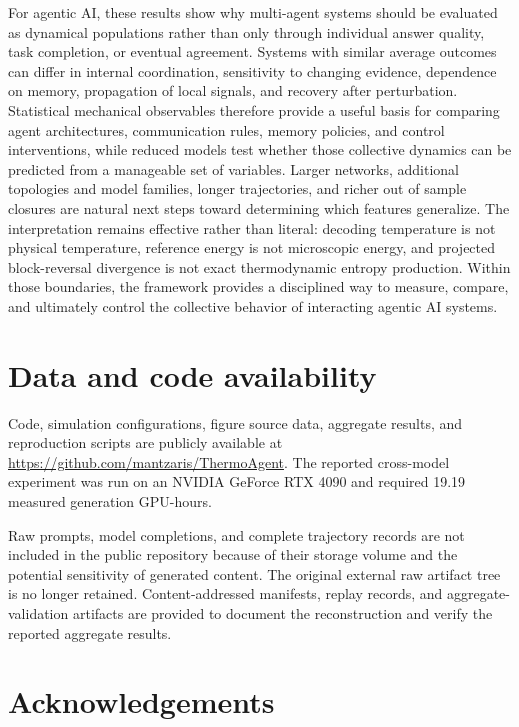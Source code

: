 \documentclass[12pt]{article}
\begin{document}
For agentic AI, these results show why multi-agent systems should be evaluated
as dynamical populations rather than only through individual answer quality,
task completion, or eventual agreement. Systems with similar average outcomes
can differ in internal coordination, sensitivity to changing evidence,
dependence on memory, propagation of local signals, and recovery after
perturbation. Statistical mechanical observables therefore provide a useful
basis for comparing agent architectures, communication rules, memory policies,
and control interventions, while reduced models test whether those collective
dynamics can be predicted from a manageable set of variables. Larger networks,
additional topologies and model families, longer trajectories, and richer
out of sample closures are natural next steps toward determining which
features generalize. The interpretation remains effective rather than
literal: decoding temperature is not physical temperature, reference energy
is not microscopic energy, and projected block-reversal divergence is not
exact thermodynamic entropy production. Within those boundaries, the framework
provides a disciplined way to measure, compare, and ultimately control the
collective behavior of interacting agentic AI systems.






\section*{Data and code availability}

Code, simulation configurations, figure source data, aggregate results, and
reproduction scripts are publicly available at
\url{https://github.com/mantzaris/ThermoAgent}. The reported cross-model
experiment was run on an NVIDIA GeForce RTX 4090 and required 19.19 measured
generation GPU-hours.

Raw prompts, model completions, and complete trajectory records are not
included in the public repository because of their storage volume and the
potential sensitivity of generated content. The original external raw artifact
tree is no longer retained. Content-addressed manifests, replay records, and
aggregate-validation artifacts are provided to document the reconstruction
and verify the reported aggregate results.




\section*{Acknowledgements}
\end{document}
